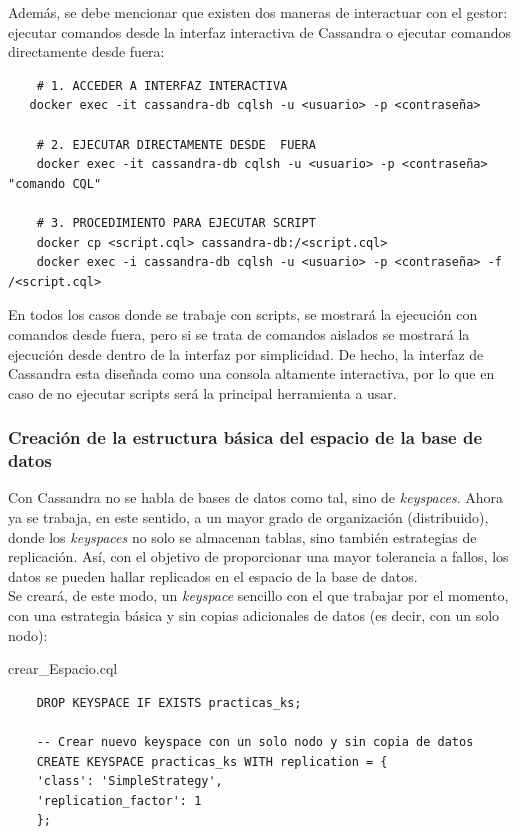 \documentclass{article}
\begin{document}
Además, se debe mencionar que existen dos maneras de interactuar con el gestor: ejecutar comandos desde la interfaz interactiva de Cassandra o ejecutar comandos directamente desde fuera:
\begin{lstlisting}
    # 1. ACCEDER A INTERFAZ INTERACTIVA
   docker exec -it cassandra-db cqlsh -u <usuario> -p <contraseña>

    # 2. EJECUTAR DIRECTAMENTE DESDE  FUERA
    docker exec -it cassandra-db cqlsh -u <usuario> -p <contraseña> "comando CQL"

    # 3. PROCEDIMIENTO PARA EJECUTAR SCRIPT
    docker cp <script.cql> cassandra-db:/<script.cql>
    docker exec -i cassandra-db cqlsh -u <usuario> -p <contraseña> -f /<script.cql>
\end{lstlisting}

En todos los casos donde se trabaje con scripts, se mostrará la ejecución con comandos desde fuera, pero si se trata de comandos aislados se mostrará la ejecución desde dentro de la interfaz por simplicidad. De hecho, la interfaz de Cassandra esta diseñada como una consola altamente interactiva, por lo que en caso de no ejecutar scripts será la principal herramienta a usar.
\newline
\subsubsection{Creación de la estructura básica del espacio de la base de datos}

Con Cassandra no se habla de bases de datos como tal, sino de \textit{keyspaces}. Ahora ya se trabaja, en este sentido, a un mayor grado de organización (distribuido), donde los \textit{keyspaces} no solo se almacenan tablas, sino también estrategias de replicación. Así, con el objetivo de proporcionar una mayor tolerancia a fallos, los datos se pueden hallar replicados en el espacio de la base de datos.
\\
Se creará, de este modo, un \textit{keyspace} sencillo con el que trabajar por el momento, con una estrategia básica y sin copias adicionales de datos (es decir, con un solo nodo):

\begin{scriptbox}{crear\_Espacio.cql}
\begin{verbatim}
    DROP KEYSPACE IF EXISTS practicas_ks;

    -- Crear nuevo keyspace con un solo nodo y sin copia de datos
    CREATE KEYSPACE practicas_ks WITH replication = {
    'class': 'SimpleStrategy',
    'replication_factor': 1
    };
\end{verbatim}
\end{scriptbox}
\end{document}
